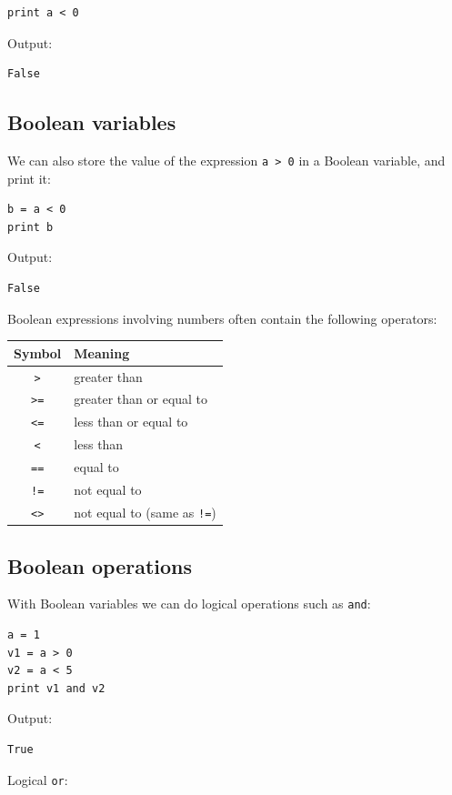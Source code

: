 \begin{verbatim}
print a < 0
\end{verbatim}
Output:

\begin{verbatim}
False
\end{verbatim}

\subsection{Boolean variables}

We can also store the value of the expression {\tt a > 0} in a Boolean variable,
and print it:
\begin{verbatim}
b = a < 0
print b
\end{verbatim}
Output:

\begin{verbatim}
False
\end{verbatim}
Boolean expressions involving numbers often contain the following operators:

\begin{center}
\begin{tabular}{|c|l|}
\hline
Symbol & Meaning \\
\hline
{\tt >} & greater than\\
{\tt >=} & greater than or equal to\\
{\tt <=} & less than or equal to\\
{\tt <} & less than\\
{\tt ==} & equal to\\
{\tt !=} & not equal to\\
{\tt <>} & not equal to (same as {\tt !=})\\
\hline
\end{tabular}
\end{center}

\subsection{Boolean operations}

With Boolean variables we can do logical operations such as {\tt and}:

\begin{verbatim}
a = 1
v1 = a > 0
v2 = a < 5
print v1 and v2
\end{verbatim}
Output:

\begin{verbatim}
True
\end{verbatim}
Logical {\tt or}:

